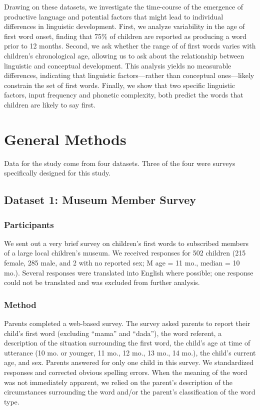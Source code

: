 \documentclass[10pt,letterpaper]{article}
\begin{document}
Drawing on these datasets, we investigate the time-course of the emergence of productive language and potential factors that might lead to individual differences in linguistic development. First, we analyze variability in the age of first word onset, finding that 75\% of children are reported as producing a word prior to 12 months. Second, we ask whether the range of of first words varies with children's chronological age, allowing us to ask about the relationship between linguistic and conceptual development. This analysis yields no measurable differences, indicating that linguistic factors---rather than conceptual ones---likely constrain the set of first words. Finally, we show that two specific linguistic factors, input frequency and phonetic complexity, both predict the words that children are likely to say first.
\vspace{-.2em}
\section{General Methods}

Data for the study come from four datasets. Three of the four were surveys specifically designed for this study. 
\vspace{-.2em}
\subsection{Dataset 1: Museum Member Survey}

\subsubsection{Participants}

We sent out a very brief survey on children's first words to subscribed members of a large local children's museum. We received responses for 502 children (215 female, 285 male, and 2 with no reported sex; M age = 11 mo., median = 10 mo.). Several responses were translated into English where possible; one response could not be translated and was excluded from further analysis. 

\subsubsection{Method}

Parents completed a web-based survey. The survey asked parents to report their child's first word (excluding ``mama'' and ``dada''), the word referent, a description of the situation surrounding the first word, the child's age at time of utterance (10 mo. or younger, 11 mo., 12 mo., 13 mo., 14 mo.), the child's current age, and sex. Parents answered for only one child in this survey. We standardized responses and corrected obvious spelling errors. When the meaning of the word was not immediately apparent, we relied on the parent's description of the circumstances surrounding the word and/or the parent's classification of the word type.
\end{document}
